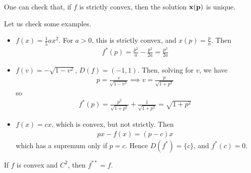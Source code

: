 \documentclass{../../template/note}
\begin{document}
    \begin{remark*}
        One can check that, if $f$ is strictly convex, then the solution $\V x(\V p)$ is unique.
    \end{remark*}
    
    \begin{example*}
        Let us check some examples.
        \begin{itemize}
            \item $f(x) = \frac 1 5 ax^2$. For $a > 0$, this is strictly convex, and $x(p) = \frac p a$. Then
            \begin{align*}
                f^*(p) = \frac{p^2}{a} - \frac{p^2}{2a} = \frac{p^2}{2a}
            \end{align*}
            \item $f(v) = -\sqrt{1-v^2}$, $D(f) = (-1, 1)$. Then, solving for $v$, we have
            \begin{align*}
                p = \frac{v}{\sqrt{1-v^2}} \implies v = \frac{p}{\sqrt{1+p^2}}
            \end{align*}
            so
            \begin{align*}
                f^*(p) = \frac{p^2}{\sqrt{1+p^2}} + \frac{1}{\sqrt{1+p^2}} = \sqrt{1+p^2}
            \end{align*}
            \item $f(x) = cx$, which is convex, but not strictly. Then
            \begin{align*}
                px - f(x) = (p-c)x
            \end{align*}
            which has a supremum only if $p=c$. Hence $D(f^*) = \{c\}$, and $f^*(c) = 0$.
        \end{itemize}
    \end{example*}
    
    \begin{theorem}
        If $f$ is convex and $C^2$, then $f^{**} = f$.
    \end{theorem}
    
\end{document}

